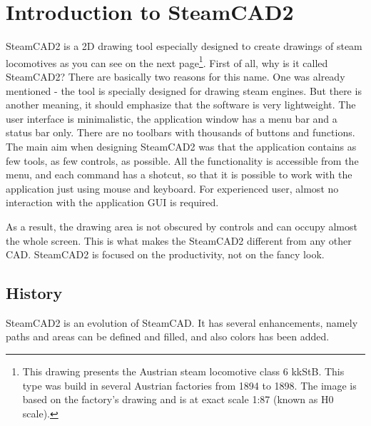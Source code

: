 \chapter{Introduction to SteamCAD2}\label{chap:intro}

SteamCAD2 is a 2D drawing tool especially designed to create drawings of
steam locomotives as you can see on the next page\footnote{This drawing presents the
Austrian steam locomotive class 6 kkStB. This type was build in several Austrian
factories from 1894 to 1898. The image is based on the factory's drawing and is at
exact scale 1:87 (known as H0 scale).}. First of all, why is it called SteamCAD2?
There are basically two reasons for this name. One was already mentioned - the tool is
specially designed for drawing steam engines. But there is another meaning, it should
emphasize that the software is very lightweight. The user interface is minimalistic,
the application window has a menu bar and a status bar only. There are no toolbars with
thousands of buttons and functions. The main aim when designing SteamCAD2 was that the
application contains as few tools, as few controls, as possible. All the functionality
is accessible from the menu, and each command has a shotcut, so that it is possible to
work with the application just using mouse and keyboard. For experienced user, almost
no interaction with the application GUI is required.

As a result, the drawing area is not obscured by controls and can occupy almost the whole
screen. This is what makes the SteamCAD2 different from any other CAD. SteamCAD2 is focused
on the productivity, not on the fancy look.

\section{History}

SteamCAD2 is an evolution of SteamCAD. It has several enhancements, namely paths and areas
can be defined and filled, and also colors has been added.

